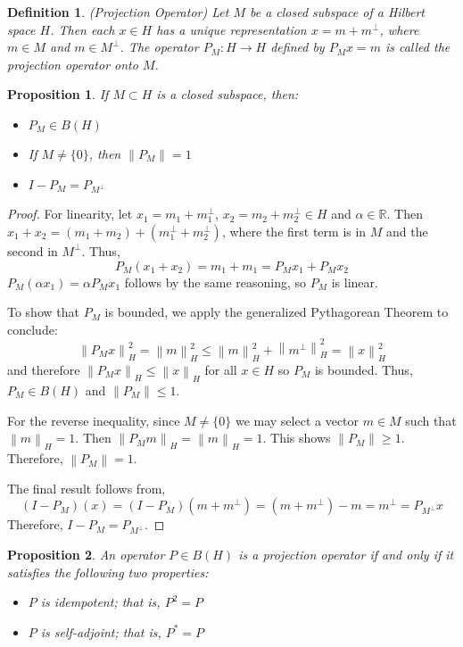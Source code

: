 \documentclass[12pt]{article}
\newcommand*{\norm}[1]{\left\lVert#1\right\rVert}
\newtheorem{definition}{Definition}
\newtheorem{prop}{Proposition}
\begin{document}
\begin{definition} 
(Projection Operator) Let $M$ be a closed subspace of a Hilbert space $H$. Then each $x \in H$ has a unique
representation $x = m + m^\perp$, where $m \in M$ and $m \in M^\perp$. The operator $P_M: H \to H$ defined 
by $P_Mx = m$ is called the projection operator onto $M$. 
\end{definition}

\begin{prop} \label{projection_properties}
If $M \subset H$ is a closed subspace, then: 
\begin{itemize} 
\item $P_M \in B(H)$
\item If $M \neq \{0\}$, then $\norm{P_M} = 1$
\item $I - P_M = P_{M^\perp}$
\end{itemize} 
\end{prop}

\begin{proof} 
For linearity, let $x_1 = m_1 + m_1^\perp$, $x_2 = m_2 + m_2^\perp \in H$ and $\alpha \in \mathbb{R}$. Then 
$x_1 + x_2 = (m_1 + m_2) + (m_1^\perp + m_2^\perp)$, where the first term is in 
$M$ and the second in $M^\perp$. Thus, \[P_M (x_1 + x_2) = m_1 + m_1 = P_M x_1 + P_M x_2\]
$P_M (\alpha x_1) = \alpha P_M x_1$ follows by the same reasoning, so $P_M$ is linear. 

To show that $P_M$ is bounded, we apply the generalized Pythagorean Theorem to conclude: 
\[\norm{P_M x}_H^2 = \norm{m}_H^2 \leq \norm{m}_H^2 + \norm{m^\perp}_H^2 = \norm{x}_H^2\]
and therefore $\norm{P_M x}_H \leq \norm{x}_H$ for all $x \in H$ so $P_M$ is bounded. Thus, $P_M \in B(H)$
and $\norm{P_M} \leq 1$. 

For the reverse inequality, since $M \neq \{0\}$ we may select a vector $m \in M$ such that $\norm{m}_H = 1$.
Then $\norm{P_M m}_H = \norm{m}_H = 1$. This shows $\norm{P_M} \geq 1$. Therefore, $\norm{P_M} = 1$. 

The final result follows from, \[(I - P_M)(x) = (I - P_M)(m + m^\perp) = (m + m^\perp) - m = m^\perp = P_{M^\perp}x\]
Therefore, $I - P_M = P_{M^\perp}$. 
\end{proof} 

\begin{prop} 
An operator $P \in B(H)$ is a projection operator if and only if it satisfies the following two properties: 
\begin{itemize} 
\item $P$ is idempotent; that is, $P^2 = P$
\item $P$ is self-adjoint; that is, $P^* = P$
\end{itemize} 
\end{prop} 
\end{document}
